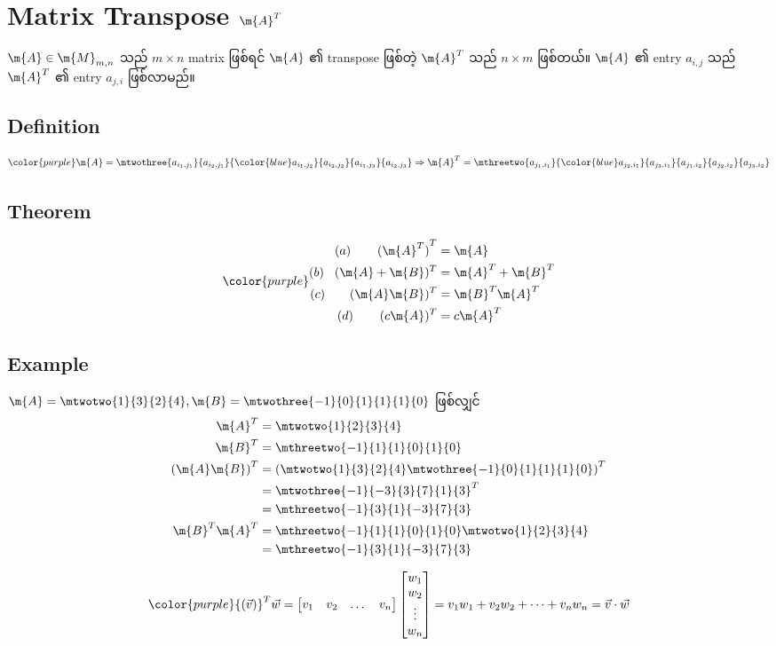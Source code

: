 \section{Matrix Transpose $\m{A}^T$}
$\m{A}\in\m{M}_{m,n}$ သည် $m \times n$ matrix ဖြစ်ရင် $\m{A}$ ၏ transpose ဖြစ်တဲ့ $\m{A}^T$ သည် $n \times m$ ဖြစ်တယ်။ $\m{A}$ ၏ entry $a_{i,j}$ သည် $\m{A}^T$ ၏ entry $a_{j,i}$ ဖြစ်လာမည်။
\subsection{Definition}
\begin{equation}
    {\color{purple}
    \m{A}=\mtwothree{a_{i_1,j_1}}{a_{i_2,j_1}}{{\color{blue} a_{i_1,j_2}}}{a_{i_2,j_2}}{a_{i_1,j_3}}{a_{i_2,j_3}}\Rightarrow\m{A}^T=\mthreetwo{a_{j_1,i_1}}{{\color{blue} a_{j_2,i_1}}}{a_{j_3,i_1}}{a_{j_1,i_2}}{a_{j_2,i_2}}{a_{j_3,i_2}}
    }
\end{equation}
\subsection{Theorem}
\begin{equation}
    {\color{purple} \begin{split}
        (a)\hspace{7.5mm}{(\m{A}^T)}^T&=\m{A} \\
        (b)\hspace{3mm}(\m{A}+\m{B})^T&=\m{A}^T+\m{B}^T \\
        (c)\hspace{7mm}(\m{A}\m{B})^T&=\m{B}^T\m{A}^T \\
        (d)\hspace{7.5mm}(c\m{A})^T&=c\m{A}^T
    \end{split}}
\end{equation}
\subsection{Example}
$\m{A}=\mtwotwo{1}{3}{2}{4},\m{B}=\mtwothree{-1}{0}{1}{1}{1}{0}$ ဖြစ်လျှင်
\[
    \begin{split}
        \m{A}^T&=\mtwotwo{1}{2}{3}{4} \\
        \m{B}^T&=\mthreetwo{-1}{1}{1}{0}{1}{0} \\
        {(\m{A}\m{B})}^T&={\left(\mtwotwo{1}{3}{2}{4}\mtwothree{-1}{0}{1}{1}{1}{0}\right)}^T \\
        &=\mtwothree{-1}{-3}{3}{7}{1}{3}^T \\
        &=\mthreetwo{-1}{3}{1}{-3}{7}{3} \\
        \m{B}^T\m{A}^T&=\mthreetwo{-1}{1}{1}{0}{1}{0}\mtwotwo{1}{2}{3}{4} \\
        &=\mthreetwo{-1}{3}{1}{-3}{7}{3}
    \end{split}
\]

\begin{equation}
    {\color{purple} {(\vec{v})}^T\vec{w}=\begin{bmatrix}
        v_1 & v_2 & \dots & v_n
    \end{bmatrix}\begin{bmatrix}
        w_1 \\ w_2 \\ \vdots \\ w_n
    \end{bmatrix}=v_1w_1+v_2w_2+\dots+v_nw_n=\vec{v} \cdot \vec{w}}
\end{equation}